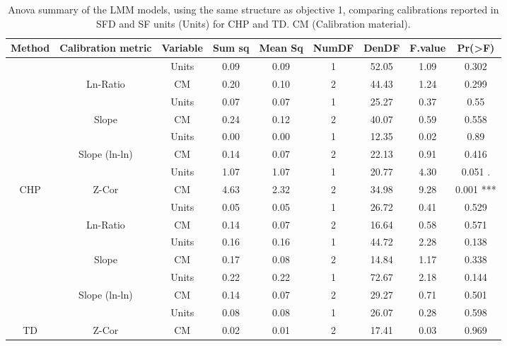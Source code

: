 \documentclass[11pt,twoside]{reedthesis}
\begin{document}
\newpage
\begin{table}[!h]

\caption[Anova summary of the LMM models.]{\label{tab:unnamed-chunk-2}Anova summary of the LMM models, using the same structure as objective 1, comparing calibrations reported in SFD and SF units (Units) for CHP and TD. CM (Calibration material).}
\centering
\fontsize{6}{8}\selectfont
\begin{tabular}[t]{ccccccccc}
\toprule
Method & Calibration metric & Variable & Sum sq & Mean Sq & NumDF & DenDF & F.value & Pr(>F)\\
\midrule
 &  & Units & 0.09 & 0.09 & 1 & 52.05 & 1.09 & 0.302\\
\cmidrule{3-9}
 & \multirow[t]{-2}{*}{\centering\arraybackslash Ln-Ratio} & CM & 0.20 & 0.10 & 2 & 44.43 & 1.24 & 0.299\\
\cmidrule{2-9}
 &  & Units & 0.07 & 0.07 & 1 & 25.27 & 0.37 & 0.55\\
\cmidrule{3-9}
 & \multirow[t]{-2}{*}{\centering\arraybackslash Slope} & CM & 0.24 & 0.12 & 2 & 40.07 & 0.59 & 0.558\\
\cmidrule{2-9}
 &  & Units & 0.00 & 0.00 & 1 & 12.35 & 0.02 & 0.89\\
\cmidrule{3-9}
 & \multirow[t]{-2}{*}{\centering\arraybackslash Slope (ln-ln)} & CM & 0.14 & 0.07 & 2 & 22.13 & 0.91 & 0.416\\
\cmidrule{2-9}
 &  & Units & 1.07 & 1.07 & 1 & 20.77 & 4.30 & 0.051 .\\
\cmidrule{3-9}
\multirow[t]{-8}{*}{\centering\arraybackslash CHP} & \multirow[t]{-2}{*}{\centering\arraybackslash Z-Cor} & CM & 4.63 & 2.32 & 2 & 34.98 & 9.28 & 0.001 ***\\
\cmidrule{1-9}
 &  & Units & 0.05 & 0.05 & 1 & 26.72 & 0.41 & 0.529\\
\cmidrule{3-9}
 & \multirow[t]{-2}{*}{\centering\arraybackslash Ln-Ratio} & CM & 0.14 & 0.07 & 2 & 16.64 & 0.58 & 0.571\\
\cmidrule{2-9}
 &  & Units & 0.16 & 0.16 & 1 & 44.72 & 2.28 & 0.138\\
\cmidrule{3-9}
 & \multirow[t]{-2}{*}{\centering\arraybackslash Slope} & CM & 0.17 & 0.08 & 2 & 14.84 & 1.17 & 0.338\\
\cmidrule{2-9}
 &  & Units & 0.22 & 0.22 & 1 & 72.67 & 2.18 & 0.144\\
\cmidrule{3-9}
 & \multirow[t]{-2}{*}{\centering\arraybackslash Slope (ln-ln)} & CM & 0.14 & 0.07 & 2 & 29.27 & 0.71 & 0.501\\
\cmidrule{2-9}
 &  & Units & 0.08 & 0.08 & 1 & 26.07 & 0.28 & 0.598\\
\cmidrule{3-9}
\multirow[t]{-8}{*}{\centering\arraybackslash TD} & \multirow[t]{-2}{*}{\centering\arraybackslash Z-Cor} & CM & 0.02 & 0.01 & 2 & 17.41 & 0.03 & 0.969\\
\bottomrule
\end{tabular}
\end{table}
\end{document}
